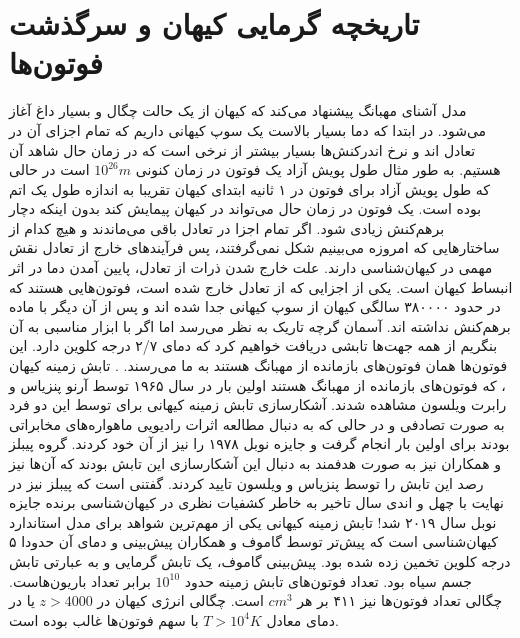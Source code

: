 \section{تاریخچه گرمایی کیهان و سرگذشت فوتون‌ها }
\label{subsec:thermal}
مدل آشنای مهبانگ
پیشنهاد می‌کند که کیهان از یک حالت چگال و بسیار داغ آغاز می‌شود. در ابتدا که دما بسیار بالاست یک سوپ کیهانی داریم که  تمام اجزای آن در تعادل اند و نرخ اندرکنش‌ها بسیار بیشتر از نرخی است که در زمان حال شاهد آن هستیم. به طور مثال طول پویش آزاد یک فوتون در زمان کنونی 
$10^{26} m$
است در حالی که طول پویش آزاد برای فوتون در ۱ ثانیه ابتدای کیهان تقریبا به اندازه طول یک اتم بوده است. 
\cite{dodelson2003modern}
یک فوتون در زمان حال می‌تواند در کیهان پیمایش کند بدون اینکه دچار برهم‌کنش زیادی شود. اگر تمام اجزا در تعادل باقی می‌ماندند و هیچ کدام از ساختارهایی که امروزه می‌بینیم شکل نمی‌گرفتند، پس فرآیندهای خارج از تعادل نقش مهمی در کیهان‌شناسی دارند. علت خارج شدن ذرات از تعادل، پایین آمدن دما در اثر انبساط کیهان است. یکی از اجزایی که از تعادل خارج شده است، فوتون‌هایی هستند که در حدود ۳۸۰۰۰۰ سالگی کیهان از سوپ کیهانی جدا شده اند و پس از آن دیگر با ماده برهم‌کنش نداشته اند. آسمان گرچه تاریک به نظر می‌رسد اما اگر با ابزار مناسبی به آن بنگریم از همه جهت‌ها تابشی دریافت خواهیم کرد که دمای ۲/۷ درجه کلوین دارد. این فوتون‌ها همان فوتون‌های بازمانده از مهبانگ هستند به ما می‌رسند. . تابش زمینه کیهان
، که فوتون‌های بازمانده از مهبانگ هستند اولین بار در سال ۱۹۶۵ توسط آرنو پنزیاس 
و رابرت ویلسون
مشاهده شدند. 
\cite{penzias1965measurement} 
آشکارسازی تابش زمینه کیهانی برای توسط این دو فرد به صورت تصادفی و در حالی که به دنبال مطالعه اثرات رادیویی ماهواره‌های مخابراتی بودند برای اولین بار انجام گرفت و جایزه نوبل ۱۹۷۸ را نیز از آن خود کردند. گروه پیبلز 
و همکاران نیز به صورت هدفمند به دنبال این آشکارسازی این تابش بودند که آن‌ها نیز رصد این تابش را توسط پنزیاس و ویلسون تایید کردند. 
 \cite{dicke1965cosmic}
 گفتنی است که پیبلز نیز در نهایت با چهل و اندی سال تاخیر به خاطر کشفیات نظری در کیهان‌شناسی برنده جایزه نوبل سال ۲۰۱۹ شد!
تابش زمینه کیهانی یکی از مهم‌ترین شواهد برای مدل استاندارد کیهان‌شناسی است که پیش‌تر توسط گاموف 
و همکاران پیش‌بینی و دمای آن حدودا ۵ درجه کلوین تخمین زده شده بود. پیش‌بینی گاموف، یک تابش گرمایی و به عبارتی تابش جسم سیاه بود. 
\cite{gamow1948evolution} 
تعداد فوتون‌های تابش زمینه حدود $10^{10}$ برابر تعداد باریون‌هاست. چگالی تعداد فوتون‌‌ها نیز ۴۱۱ بر هر $cm^{3}$ است.
\cite{dodelson2003modern}
 چگالی انرژی کیهان در
 $z > 4000$
 یا در دمای معادل
  $T > 10^4 K$
 با سهم فوتون‌ها غالب بوده است. 
\cite{durrer2015cosmic}

